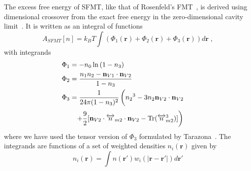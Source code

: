 \documentclass[letterpaper,twocolumn,amsmath,amssymb,prb]{revtex4-1}
\newcommand{\rr}{\textbf{r}}
\begin{document}
The excess free energy of SFMT, like that of Rosenfeld's
FMT~\cite{rosenfeld1989}, is derived using dimensional crossover 
from the exact free energy in the zero-dimensional cavity limit~\cite{schmidt1999density}. 
It is written as an integral of functions
\begin{equation}
A_\textit{SFMT}[n] = k_B T \int \left(\Phi_1(\rr) + \Phi_2(\rr) +
\Phi_3(\rr)\right) d\rr \; , \label{eq:sfmt-excess-free}
\end{equation}
with integrands
\begin{align}
\Phi_1 &= -n_0 \ln\left( 1 - n_3\right)\\
\Phi_2 &= \frac{n_1 n_2 - \mathbf{n}_{V1}\cdot\mathbf{n}_{V2}}{1-n_3} \\
\Phi_3 &= \frac{1}{24\pi(1-n_3)^2}\left({n_2}^3-3n_2\mathbf{n}_{V2}\cdot\mathbf{n}_{V2}\color{white}\frac{1}{1}\right)\color{black}
\label{eq:sfmt-phi3}
\end{align}
\begin{displaymath}\color{white}\left(\color{black}+\frac{9}{2}[\mathbf{n}_{V2}\cdot{\overleftrightarrow{n}_{m2}}\cdot{\mathbf{n}_{V2}}-\operatorname{Tr}({\overleftrightarrow{n}^3_{m2}})]\right)\end{displaymath}
where we have used the tensor version of $\Phi_3$ formulated by Tarazona~\cite{tarazonaYEAR  phi3,santos2012phi3}.
The integrands are functions of a set of weighted densities $n_{i}(\textbf{r})$ given by %
\begin{equation}
  n_{i}(\textbf{r}) = \int
  n(\textbf{r}')w_i(|\textbf{r}-\textbf{r}'|) d\textbf{r}'
  \label{eq:n-convolution}
\end{equation}
\end{document}
